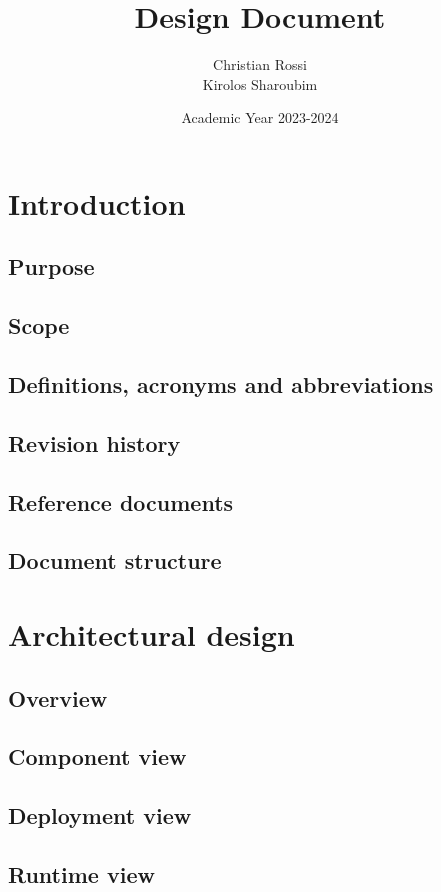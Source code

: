 \documentclass[12pt, a4paper]{report}
\title{Design Document}
\author{Christian Rossi \\ Kirolos Sharoubim}
\date{Academic Year 2023-2024}
\begin{document}
\maketitle

\newpage

\tableofcontents

\newpage

\chapter{Introduction}
    \section{Purpose}
    \section{Scope}
    \section{Definitions, acronyms and abbreviations}
    \section{Revision history}
    \section{Reference documents}
    \section{Document structure}

\newpage 

\chapter{Architectural design}
    \section{Overview}
    \section{Component view}
    \section{Deployment view}
    \section{Runtime view}
\end{document}
